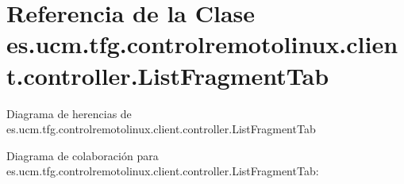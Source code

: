 \hypertarget{classes_1_1ucm_1_1tfg_1_1controlremotolinux_1_1client_1_1controller_1_1ListFragmentTab}{\section{Referencia de la Clase es.\-ucm.\-tfg.\-controlremotolinux.\-client.\-controller.\-List\-Fragment\-Tab}
\label{classes_1_1ucm_1_1tfg_1_1controlremotolinux_1_1client_1_1controller_1_1ListFragmentTab}
}


Diagrama de herencias de es.\-ucm.\-tfg.\-controlremotolinux.\-client.\-controller.\-List\-Fragment\-Tab


Diagrama de colaboración para es.\-ucm.\-tfg.\-controlremotolinux.\-client.\-controller.\-List\-Fragment\-Tab\-:

